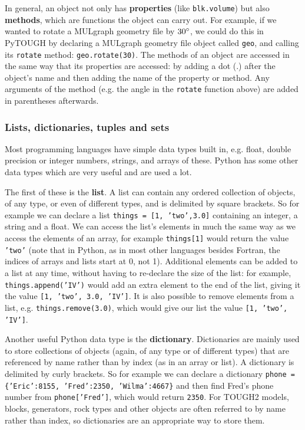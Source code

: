 In general, an object not only has \textbf{properties} (like \texttt{blk.volume}) but also \textbf{methods}, which are functions the object can carry out.  For example, if we wanted to rotate a MULgraph geometry file by $30\degree$, we could do this in PyTOUGH by declaring a MULgraph geometry file object called \texttt{geo}, and calling its \texttt{rotate} method: \texttt{geo.rotate(30)}.  The methods of an object are accessed in the same way that its properties are accessed: by adding a dot (.) after the object's name and then adding the name of the property or method.  Any arguments of the method (e.g. the angle in the \texttt{rotate} function above) are added in parentheses afterwards.

\subsubsection{Lists, dictionaries, tuples and sets}

Most programming languages have simple data types built in, e.g. float, double precision or integer numbers, strings, and arrays of these.  Python has some other data types which are very useful and are used a lot.

The first of these is the \textbf{list}.  A list can contain any ordered collection of objects, of any type, or even of different types, and is delimited by square brackets.  So for example we can declare a list \texttt{things = [1, 'two',3.0]} containing an integer, a string and a float.  We can access the list's elements in much the same way as we access the elements of an array, for example \texttt{things[1]} would return the value \texttt{'two'} (note that in Python, as in most other languages besides Fortran, the indices of arrays and lists start at 0, not 1).  Additional elements can be added to a list at any time, without having to re-declare the size of the list: for example, \texttt{things.append('IV')} would add an extra element to the end of the list, giving it the value \texttt{[1, 'two', 3.0, 'IV']}.  It is also possible to remove elements from a list, e.g. \texttt{things.remove(3.0)}, which would give our list the value \texttt{[1, 'two', 'IV']}.

Another useful Python data type is the \textbf{dictionary}.  Dictionaries are mainly used to store collections of objects (again, of any type or of different types) that are referenced by name rather than by index (as in an array or list).  A dictionary is delimited by curly brackets.  So for example we can declare a dictionary \texttt{phone = \{'Eric':8155, 'Fred':2350, 'Wilma':4667\}} and then find Fred's phone number from \texttt{phone['Fred']}, which would return \texttt{2350}.  For TOUGH2 models, blocks, generators, rock types and other objects are often referred to by name rather than index, so dictionaries are an appropriate way to store them.

